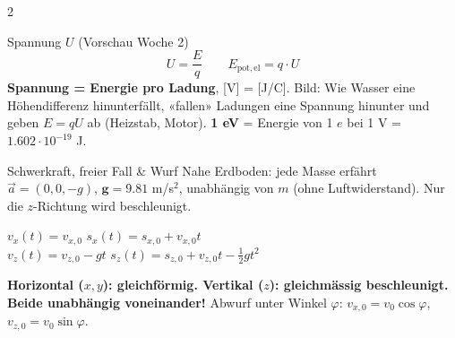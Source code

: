 \documentclass[10pt,a4paper]{article}
\begin{document}
\begin{multicols}{2}
\begin{gbox}{Spannung $U$ (Vorschau Woche 2)}
\[ U = \frac{E}{q}\qquad E_{\mathrm{pot,el}} = q\cdot U \]
\textbf{Spannung = Energie pro Ladung}, [V] = [J/C]. Bild: Wie Wasser eine Höhendifferenz hinunterfällt, «fallen» Ladungen eine Spannung hinunter und geben $E = qU$ ab (Heizstab, Motor). \textbf{1 eV} = Energie von 1 $e$ bei 1 V = $1.602\cdot10^{-19}$ J.
\end{gbox}

\begin{gbox}{Schwerkraft, freier Fall \& Wurf}
Nahe Erdboden: jede Masse erfährt $\vec{a} = (0,0,-g)$, $\mathbf{g = 9.81}$ m/s$^2$, unabhängig von $m$ (ohne Luftwiderstand). Nur die $z$-Richtung wird beschleunigt.

\vspace{2pt}
$v_x(t) = v_{x,0}$ \qquad $s_x(t) = s_{x,0} + v_{x,0}t$\\
$v_z(t) = v_{z,0} - g t$ \qquad $s_z(t) = s_{z,0} + v_{z,0}t - \tfrac{1}{2}g t^2$

\vspace{2pt}
\textbf{Horizontal ($x,y$): gleichförmig. Vertikal ($z$): gleichmässig beschleunigt. Beide unabhängig voneinander!} Abwurf unter Winkel $\varphi$: $v_{x,0} = v_0\cos\varphi$, $v_{z,0} = v_0\sin\varphi$.

\begin{center}
\end{center}


\end{gbox}
\end{multicols}
\end{document}

